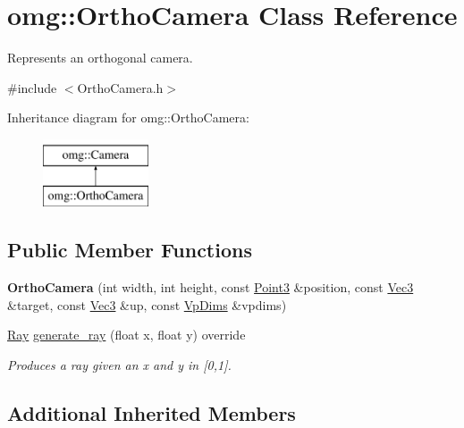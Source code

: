\hypertarget{classomg_1_1_ortho_camera}{}\section{omg\+::Ortho\+Camera Class Reference}
\label{classomg_1_1_ortho_camera}


Represents an orthogonal camera.  




{\ttfamily \#include $<$Ortho\+Camera.\+h$>$}

Inheritance diagram for omg\+::Ortho\+Camera\+:\begin{figure}[H]
\begin{center}
\leavevmode
\includegraphics[height=2.000000cm]{classomg_1_1_ortho_camera}
\end{center}
\end{figure}
\subsection*{Public Member Functions}
\begin{DoxyCompactItemize}
\item 
\mbox{\label{classomg_1_1_ortho_camera_a120f8b1856b9603b692fdf69482fa1fe}} 
{\bfseries Ortho\+Camera} (int width, int height, const \mbox{\hyperlink{namespaceomg_af3df7d66f0c70fe64649fcbe00edba5e}{Point3}} \&position, const \mbox{\hyperlink{namespaceomg_acf927839a305877d454c507f0b96730b}{Vec3}} \&target, const \mbox{\hyperlink{namespaceomg_acf927839a305877d454c507f0b96730b}{Vec3}} \&up, const \mbox{\hyperlink{structomg_1_1_camera_1_1_vp_dims}{Vp\+Dims}} \&vpdims)
\item 
\mbox{\hyperlink{classomg_1_1_ray}{Ray}} \mbox{\hyperlink{classomg_1_1_ortho_camera_af5dba96ad9cdf91121093d0c9d72e57f}{generate\+\_\+ray}} (float x, float y) override
\begin{DoxyCompactList}\small\item\em Produces a ray given an x and y in \mbox{[}0,1\mbox{]}. \end{DoxyCompactList}\end{DoxyCompactItemize}
\subsection*{Additional Inherited Members}


